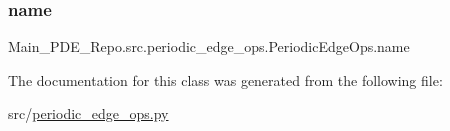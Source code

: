 \subsubsection{\texorpdfstring{name}{name}}
{\footnotesize\ttfamily Main\+\_\+\+P\+D\+E\+\_\+\+Repo.\+src.\+periodic\+\_\+edge\+\_\+ops.\+Periodic\+Edge\+Ops.\+name}



The documentation for this class was generated from the following file\+:\begin{DoxyCompactItemize}
\item 
src/\hyperlink{periodic__edge__ops_8py}{periodic\+\_\+edge\+\_\+ops.\+py}\end{DoxyCompactItemize}
